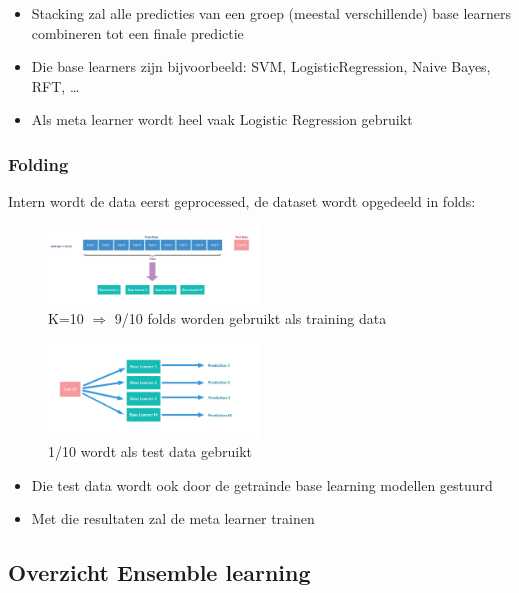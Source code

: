 \documentclass{article}
\begin{document}
\begin{itemize}
    \item Stacking zal alle predicties van een groep (meestal verschillende) base learners combineren tot een finale predictie
    \item Die base learners zijn bijvoorbeeld: SVM, LogisticRegression, Naive Bayes, RFT, \dots
    \item Als meta learner wordt heel vaak Logistic Regression gebruikt
\end{itemize}

\subsubsection{Folding}

Intern wordt de data eerst geprocessed, de dataset wordt opgedeeld in folds: 

\begin{figure}[H]
    \centering
    \includegraphics[width=0.5\textwidth]{stacking2.png}
    \caption{K=10 $\Rightarrow$ 9/10 folds worden gebruikt als training data}
\end{figure}

\begin{figure}[H]
    \centering
    \includegraphics[width=0.5\textwidth]{stacking3.png}
    \caption{1/10 wordt als test data gebruikt}
\end{figure}

\begin{itemize}
    \item Die test data wordt ook door de getrainde base learning modellen gestuurd
    \item Met die resultaten zal de meta learner trainen
\end{itemize}

\subsection{Overzicht Ensemble learning}
\end{document}
